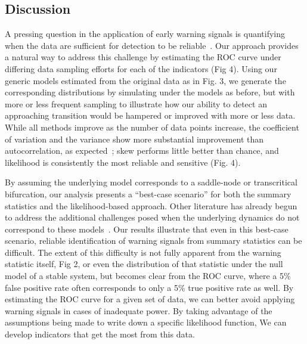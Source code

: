 \documentclass{pnastwo}
\begin{document}
\begin{article}

\section{Discussion}
A pressing question in the application of early warning signals is quantifying
when the data are sufficient for detection to be reliable~\cite{Scheffer2009, Scheffer2010, Inman2011}. 
Our approach provides a natural way to address this challenge by estimating the ROC curve under differing data sampling efforts
for each of the indicators (Fig 4). 
Using our generic models estimated from the original data as in Fig. 3, 
we generate the corresponding distributions by simulating under the models as before, 
but with more or less frequent sampling to illustrate how our ability to detect an approaching transition 
would be hampered or improved with more or less data.  
While all methods improve as the number of data points increase, 
the coefficient of variation and the variance show more substantial improvement than autocorrelation, 
as expected~\cite{Carpenter2011};⁠
skew performs little better than chance, and likelihood is consistently the most reliable and sensitive (Fig. 4). 


By assuming the underlying model corresponds to a saddle-node or transcritical bifurcation,
our analysis presents a ``best-case scenario'' for both the summary statistics and the likelihood-based approach. 
Other literature has already begun to address the additional challenges posed when the underlying 
dynamics do not correspond to these models~\cite{Hastings2010}.
Our results illustrate that even in this best-case scenario, 
reliable identification of warning signals from summary statistics can be difficult.  
The extent of this difficulty is not fully apparent from the warning statistic itself, Fig 2,
or even the distribution of that statistic under the null model of a stable system, 
but becomes clear from the ROC curve, where a 5\% false positive rate often corresponds to only a 5\% true positive rate as well.  
By estimating the ROC curve for a given set of data, 
we can better avoid applying warning signals in cases of inadequate power.
By taking advantage of the assumptions being made to write down a specific likelihood function,
We can develop indicators that get the most from this data.  



\end{article}
\end{document}
